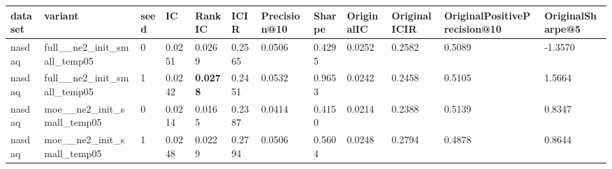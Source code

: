 \begin{tabular}{llllllllllll}
dataset & variant & seed & IC & RankIC & ICIR & Precision@10 & Sharpe & OriginalIC & OriginalICIR & OriginalPositivePrecision@10 & OriginalSharpe@5 \\
\hline
nasdaq & full__ne2_init_small_temp05 & 0 & 0.0251 & 0.0269 & 0.2565 & 0.0506 & 0.4295 & 0.0252 & 0.2582 & 0.5089 & -1.3570 \\
nasdaq & full__ne2_init_small_temp05 & 1 & 0.0242 & \textbf{0.0278} & 0.2451 & 0.0532 & 0.9653 & 0.0242 & 0.2458 & 0.5105 & 1.5664 \\
nasdaq & moe__ne2_init_small_temp05 & 0 & 0.0214 & 0.0165 & 0.2387 & 0.0414 & 0.4150 & 0.0214 & 0.2388 & 0.5139 & 0.8347 \\
nasdaq & moe__ne2_init_small_temp05 & 1 & 0.0248 & 0.0229 & 0.2794 & 0.0506 & 0.5604 & 0.0248 & 0.2794 & 0.4878 & 0.8644 \\
\end{tabular}

